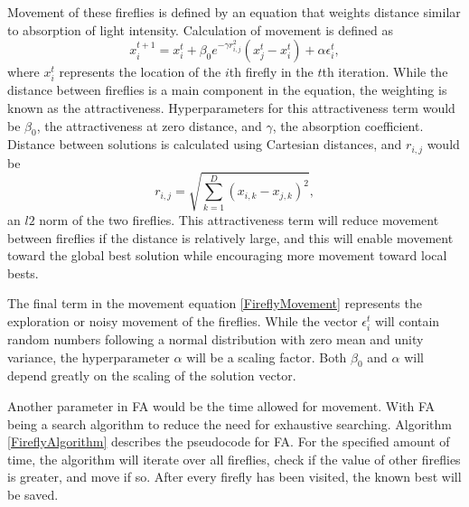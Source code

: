 \documentclass[sigconf,authordraft]{acmart}
\begin{document}
    Movement of these fireflies is defined by an equation that weights distance similar to absorption of light intensity. Calculation of movement is defined as 
    \begin{equation}
    \label{FireflyMovement}
        x^{t+1}_i = x^t_i + \beta_0 e^{-\gamma r^2_{i,j}} (x^t_j - x^t_i) + \alpha \epsilon^t_i,
    \end{equation}
    where $x^t_i$ represents the location of the $i$th firefly in the $t$th iteration. While the distance between fireflies is a main component in the equation, the weighting is known as the attractiveness. Hyperparameters for this attractiveness term would be $\beta_0$, the attractiveness at zero distance, and $\gamma$, the absorption coefficient. Distance between solutions is calculated using Cartesian distances, and $r_{i,j}$ would be 
    \begin{equation}
    \label{CartesianDistance}
        r_{i,j} = \sqrt{\sum_{k=1}^{D} (x_{i,k} - x_{j,k})^2},
    \end{equation}
    an $l2$ norm of the two fireflies. This attractiveness term will reduce movement between fireflies if the distance is relatively large, and this will enable movement toward the global best solution while encouraging more movement toward local bests.

    The final term in the movement equation \ref{FireflyMovement} represents the exploration or noisy movement of the fireflies. While the vector $\epsilon^t_i$ will contain random numbers following a normal distribution with zero mean and unity variance, the hyperparameter $\alpha$ will be a scaling factor. Both $\beta_0$ and $\alpha$ will depend greatly on the scaling of the solution vector.

    Another parameter in FA would be the time allowed for movement. With FA being a search algorithm to reduce the need for exhaustive searching. Algorithm \ref{FireflyAlgorithm} describes the pseudocode for FA. For the specified amount of time, the algorithm will iterate over all fireflies, check if the value of other fireflies is greater, and move if so. After every firefly has been visited, the known best will be saved.
\end{document}
